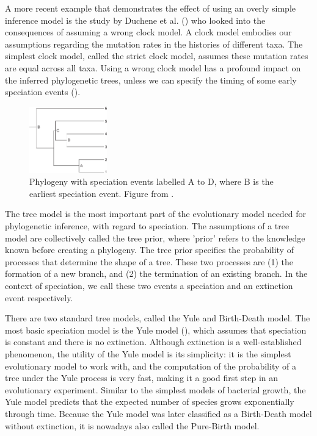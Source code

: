 A more recent example that demonstrates the effect of using an overly simple 
inference model is the study by Duchene et al. (\cite{duchene2014impact}) who looked into the consequences of assuming a wrong clock model. 
A clock model embodies our assumptions regarding the mutation rates in
the histories of different taxa. The simplest clock model, called the strict
clock model, assumes these mutation rates are equal across all taxa.
Using a wrong clock model has a profound impact 
on the inferred phylogenetic trees, unless we can
specify the timing of some early speciation 
events (\cite{duchene2014impact}).

\begin{figure}[H]
  \includegraphics[width=0.3\textwidth]{duchene_et_al_2014_fig_1.png}
  \caption{
    Phylogeny with speciation events labelled A to D,
    where B is the earliest speciation event.
    Figure from \cite{duchene2014impact}.
 }
  \label{fig:duchene2014impact}
\end{figure}

The tree model is the most important part of the evolutionary model needed for phylogenetic inference,
with regard to speciation. The assumptions of a tree model are collectively 
called the tree prior, where 'prior' refers to the knowledge
known before creating a phylogeny. The tree prior specifies the probability of
processes that determine the shape of a tree. These
two processes are (1) the formation of a new branch, 
and (2) the termination of
an existing branch. In the context of speciation, we call these
two events a speciation and an extinction event respectively.

There are two standard tree models, called the Yule
and Birth-Death model. The most basic speciation model
is the Yule model (\cite{yule1925mathematical}), 
which assumes that speciation
is constant and there is no extinction.
Although extinction is a well-established phenomenon, 
the utility of the Yule model is its simplicity: it is the
simplest evolutionary model to work with, and the computation
of the probability of a tree under the Yule process is very fast,
making it a good first step in an evolutionary experiment.
Similar to the simplest models of bacterial growth,
the Yule model predicts that the expected number of species 
grows exponentially through time.
Because the Yule model 
was later classified as a Birth-Death model without extinction,
it is nowadays also called the Pure-Birth model.

